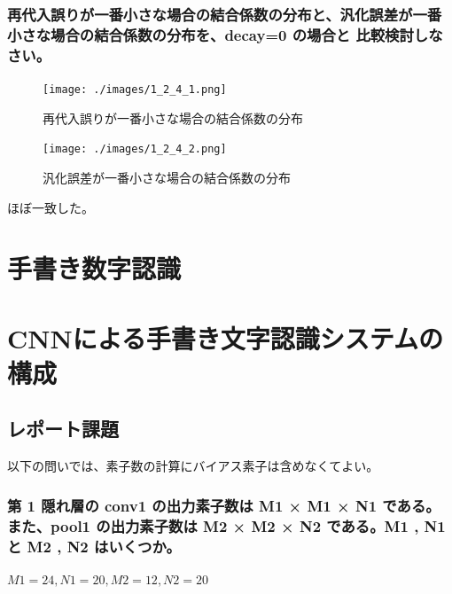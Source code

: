 \documentclass{ltjsarticle}
\begin{document}
\subsubsection{再代入誤りが一番小さな場合の結合係数の分布と、汎化誤差が一番小さな場合の結合係数の分布を、decay=0 の場合と 比較検討しなさい。}
\begin{figure}[H]
	\centering
	\texttt{[image: ./images/1\_2\_4\_1.png]}
	\caption{再代入誤りが一番小さな場合の結合係数の分布}
\end{figure}
\begin{figure}[H]
	\centering
	\texttt{[image: ./images/1\_2\_4\_2.png]}
	\caption{汎化誤差が一番小さな場合の結合係数の分布}
\end{figure}
ほぼ一致した。

\section{手書き数字認識}
%
%
%
%
\section{CNNによる手書き文字認識システムの構成}
\subsection{レポート課題}

以下の問いでは、素子数の計算にバイアス素子は含めなくてよい。

\subsubsection{第 1 隠れ層の conv1 の出力素子数は M1 × M1 × N1 である。また、pool1 の出力素子数は M2 × M2 × N2 である。M1 , N1 と M2 , N2 はいくつか。}
$M1=24,N1=20,M2=12,N2=20$
\end{document}
